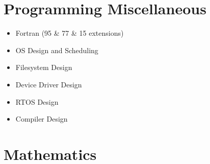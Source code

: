 \documentclass[a4paper]{article}
\begin{document}
\section{Programming Miscellaneous}
\begin{itemize}
\item Fortran (95 \& 77 \& 15 extensions)
\item OS Design and Scheduling
\item Filesystem Design
\item Device Driver Design
\item RTOS Design
\item Compiler Design
\end{itemize}

\section{Mathematics}
\end{document}
